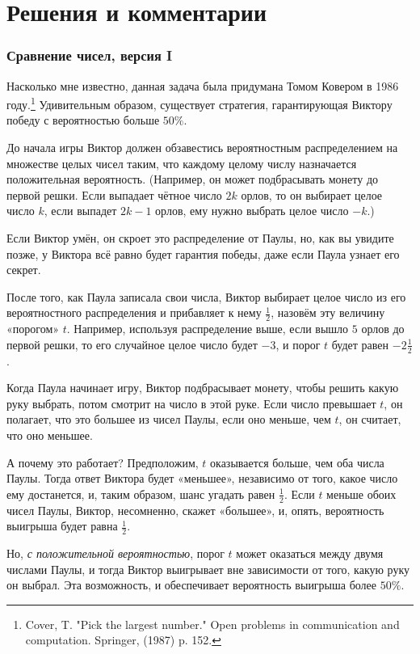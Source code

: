 \section*{Решения и комментарии}

\subsubsection*{Сравнение чисел, версия I}%

Насколько мне известно, данная задача была придумана Томом Ковером %
в 1986 году.\footnote{Cover, T. "Pick the largest number." Open problems in communication and computation. Springer, (1987) p. 152.}
Удивительным образом, существует стратегия, гарантирующая Виктору победу с вероятностью больше $50\%$.

\medskip

До начала игры Виктор должен обзавестись вероятностным распределением на множестве целых чисел таким, что каждому целому числу назначается положительная вероятность.
(Например, он может подбрасывать монету до первой решки.
Если выпадает чётное число $2k$ орлов, то он выбирает целое число $k$, если выпадет $2k-1$ орлов, ему нужно выбрать целое число $-k$.)

Если Виктор умён, он скроет это распределение от Паулы, но, как вы увидите позже, у Виктора всё равно будет гарантия победы, даже если Паула узнает его секрет.

После того, как Паула записала свои числа, Виктор выбирает целое число из его вероятностного распределения и прибавляет к нему $\tfrac12$, назовём эту величину «порогом» $t$.
Например, используя распределение выше, если вышло $5$ орлов до первой решки, то его случайное целое число будет $-3$, и порог $t$ будет равен $-2 \tfrac12$.

Когда Паула начинает игру, Виктор подбрасывает монету, чтобы решить какую руку выбрать, потом смотрит на число в этой руке.
Если число превышает $t$, он полагает, что это большее из чисел Паулы, если оно меньше, чем $t$, он считает, что оно меньшее. %

А почему это работает? 
Предположим, $t$ оказывается больше, чем оба числа Паулы.
Тогда ответ Виктора будет «меньшее», независимо от того, какое число ему достанется, и, таким образом, шанс угадать равен $\tfrac12$.
Если $t$ меньше обоих чисел Паулы, Виктор, несомненно, скажет «большее», и, опять, вероятность выигрыша будет равна $\tfrac12$.

Но, \emph{с положительной вероятностью}, порог $t$ может оказаться между двумя числами Паулы, и тогда Виктор выигрывает вне зависимости от того, какую руку он выбрал.
Эта возможность, и обеспечивает вероятность выигрыша более $50\%$.\heart


